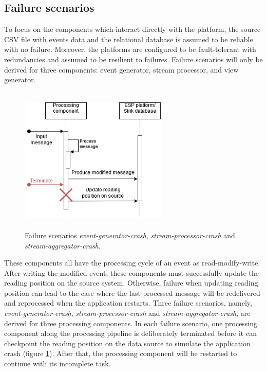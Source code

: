  
\subsection{Failure scenarios}  \label{subsection:failurescenarios}
To focus on the components which interact directly with the platform, the source CSV file with events data and the relational database is assumed to be reliable with no failure. Moreover, the platforms are configured to be fault-tolerant with redundancies and assumed to be resilient to failures.  Failure scenarios will only be derived for three components: event generator, stream processor, and view generator.

\begin{figure}[h]
	\centering
	\includegraphics[width=7cm,height=7cm]{images/reading-position-fail.png}
	\caption{Failure scenarios \emph{event-generator-crash}, \emph{stream-processor-crash} and \emph{stream-aggregator-crash}.}
	\label{fig:scenarioreadingposition}
\end{figure}

These components all have the processing cycle of an event as read-modify-write. After writing the modified event, these components must successfully update the reading position on the source system. Otherwise, failure when updating reading position can lead to the case where the last processed message will be redelivered and reprocessed when the application restarts. Three failure scenarios, namely, \emph{event-generator-crash}, \emph{stream-processor-crash} and \emph{stream-aggregator-crash}, are derived for three processing components. In each failure scenario, one processing component along the processing pipeline is deliberately terminated before it can checkpoint the reading position on the data source to simulate the application crash (figure \ref{fig:scenarioreadingposition}). After that, the processing component will be restarted to continue with its incomplete task.



